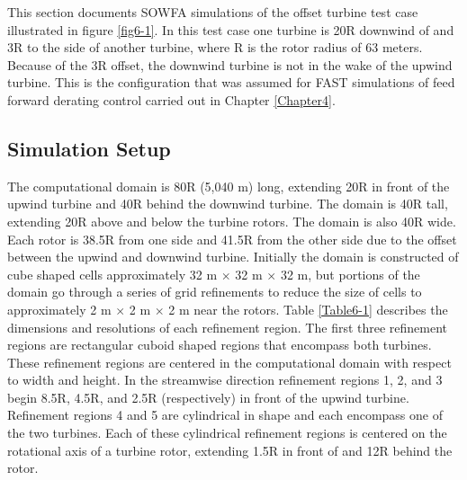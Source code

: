 This section documents SOWFA simulations of the offset turbine test case illustrated in figure \ref{fig6-1}. In this test case one turbine is 20R downwind of and 3R to the side of another turbine, where R is the rotor radius of 63 meters. Because of the 3R offset, the downwind turbine is not in the wake of the upwind turbine. This is the configuration that was assumed for FAST simulations of feed forward derating control carried out in Chapter \ref{Chapter4}. 


\subsection{Simulation Setup} \label{section6-6-1}

The computational domain is 80R (5,040 m) long, extending 20R in front of the upwind turbine and 40R behind the downwind turbine. The domain is 40R tall, extending 20R above and below the turbine rotors. The domain is also 40R wide. Each rotor is 38.5R from one side and 41.5R from the other side due to the offset between the upwind and downwind turbine. Initially the domain is constructed of cube shaped cells approximately 32 m $\times$ 32 m $\times$ 32 m, but portions of the domain go through a series of grid refinements to reduce the size of cells to approximately 2 m $\times$ 2 m $\times$ 2 m near the rotors. Table \ref{Table6-1} describes the dimensions and resolutions of each refinement region. The first three refinement regions are rectangular cuboid shaped regions that encompass both turbines. These refinement regions are centered in the computational domain with respect to width and height. In the streamwise direction refinement regions 1, 2, and 3 begin 8.5R, 4.5R, and 2.5R (respectively) in front of the upwind turbine. Refinement regions 4 and 5 are cylindrical in shape and each encompass one of the two turbines. Each of these cylindrical refinement regions is centered on the rotational axis of a turbine rotor, extending 1.5R in front of and 12R behind the rotor.


